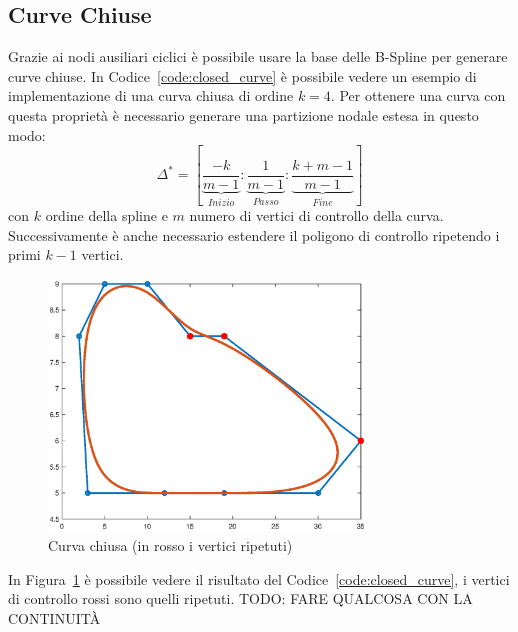 \documentclass[a4paper, 10pt]{article}
\begin{document}
\subsection{Curve Chiuse}
Grazie ai nodi ausiliari ciclici è possibile usare la base delle B-Spline per generare
curve chiuse. In Codice~\ref{code:closed_curve} è possibile vedere un esempio di implementazione di una curva chiusa di 
ordine $k = 4$.
Per ottenere una curva con questa proprietà è necessario generare una partizione nodale estesa in questo modo:
$$\Delta^* = \left[ \underbrace{\frac{-k}{m-1}}_{Inizio} : \underbrace{\frac{1}{m-1}}_{Passo} : \underbrace{\frac{k+m-1}{m-1}}_{Fine} \right]$$
con $k$ ordine della spline e $m$ numero di vertici di controllo della curva.
Successivamente è anche necessario estendere il poligono di controllo ripetendo i primi $k-1$ vertici.

\begin{figure}[]
  \centering
  \includegraphics[width=0.75\textwidth]{figure/closed_curve.eps}
  \caption{Curva chiusa (in rosso i vertici ripetuti)}
  \label{fig:closed_curve}
\end{figure} 
In Figura~\ref{fig:closed_curve} è possibile vedere il risultato del Codice~\ref{code:closed_curve}, i vertici di controllo rossi sono 
quelli ripetuti.
TODO: FARE QUALCOSA CON LA CONTINUITÀ
\end{document}
